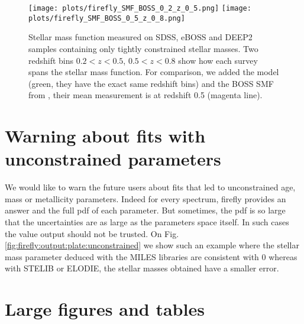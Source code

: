 \documentclass[onecolumn]{aa}
\begin{document}
\begin{figure}
\begin{center}
\texttt{[image: plots/firefly\_SMF\_BOSS\_0\_2\_z\_0\_5.png]}
\texttt{[image: plots/firefly\_SMF\_BOSS\_0\_5\_z\_0\_8.png]}
\caption{\label{fig:smf:all}Stellar mass function measured on SDSS, eBOSS and DEEP2 samples containing only tightly constrained stellar masses. Two redshift bins $0.2<z<0.5$, $0.5<z<0.8$ show how each survey spans the stellar mass function. For comparison, we added the \citet{Ilbert2013SMF} model (green, they have the exact same redshift bins) and the BOSS SMF from \citet{Maraston2013}, their mean measurement is at redshift 0.5 (magenta line).}
\end{center}
\end{figure}


\section{Warning about fits with unconstrained parameters}

We would like to warn the future users about fits that led to unconstrained age, mass or metallicity parameters. 
Indeed for every spectrum, firefly provides an answer and the full pdf of each parameter. But sometimes, the pdf is so large that the uncertainties are as large as the parameters space itself. 
In such cases the value output should not be trusted. 
On Fig. \ref{fig:firefly:output:plate:unconstrained} we show such an example where the stellar mass parameter deduced with the MILES libraries are consistent with 0 whereas with STELIB or ELODIE, the stellar masses obtained have a smaller error. 

\section{Large figures and tables}
\end{document}
